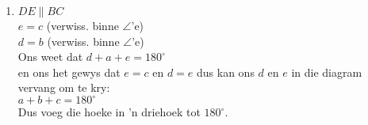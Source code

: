 \begin{eocsolutions}{}
{\begin{enumerate}[itemsep=5pt, label=\textbf{\arabic*}. ]
\begin{enumerate}[noitemsep, label=\textbf{(\alph*)} ]
		\item 
In $\triangle LMS$ en $\triangle LOS$\\
$LM = LO$ (gegee)\\
$MS=SO$ (gegee)\\
$LS$ is 'n algemene sy\\
$\therefore \triangle LMS \equiv \triangle LOS$ (SSS)\\
$\therefore \hat{L_1} = \hat{L_2}$
		\item 
In $\triangle LON$ en $\triangle LMN$\\
$LO = LM$ (gegee)\\
$\hat{L_1} = \hat{L_2}$ (gewys hierbo)\\
$LN$ 'n algemene sy\\\\
$\therefore \triangle LON \equiv \triangle LMN$ (SSS)\\
$\therefore \hat{L_1} = \hat{L_2}$
		\item %
In $\hat{M_1} = \hat{O_1}$ ($\triangle LON \equiv \triangle LMN$)\\
en $\hat{L_1} = \hat{L_2}$ (gewys hierbo)\\
$\therefore$ in $\triangle LMO\\
\hat{L_1} + \hat{L_2} + \hat{M_1} + \hat{O_1} = 180^{\circ}$ (som van $\angle$'e in $\triangle$)\\
$\therefore 2\hat{L_1} + 2\hat{O_1} = 180^{\circ}\\
2(\hat{L_1} + \hat{O_1}) = 180^{\circ}\\
\hat{L_1} + \hat{O_1} = 90^{\circ}\\$
maar $\hat{S_1} = \hat{O_1} + \hat{L_2}$ (buite $\angle$ van $\triangle=$ som binne teen. $\angle$'e)\\
$\therefore \hat{S_1} = 90^{\circ}\\
\therefore MO \perp LN$
	  \end{enumerate}
\item %
$DE \parallel BC$\\
$e=c$ (verwiss. binne $\angle$'e)\\
$d=b$ (verwiss. binne $\angle$'e)\\
Ons weet dat $d+a+e=180^\circ$\\
en ons het gewys dat $e=c$ en $d=e$ dus kan ons $d$ en $e$ in die diagram vervang om te kry:\\
$a+b+c = 180^\circ$\\
Dus voeg die hoeke in 'n driehoek tot $180^\circ$. 


\end{enumerate}}
\end{eocsolutions}

